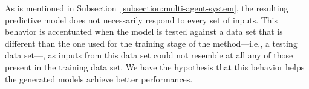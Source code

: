 \documentclass{ieeeaccess}
\begin{document}
As is mentioned in Subsection~\ref{subsection:multi-agent-system}, the resulting predictive model does not necessarily respond to every set of inputs. This behavior is accentuated when the model is tested against a data set that is different than the one used for the training stage of the method---i.e., a testing data set---, as inputs from this data set could not resemble at all any of those present in the training data set. We have the hypothesis that this behavior helps the generated models achieve better performances.




\end{document}
